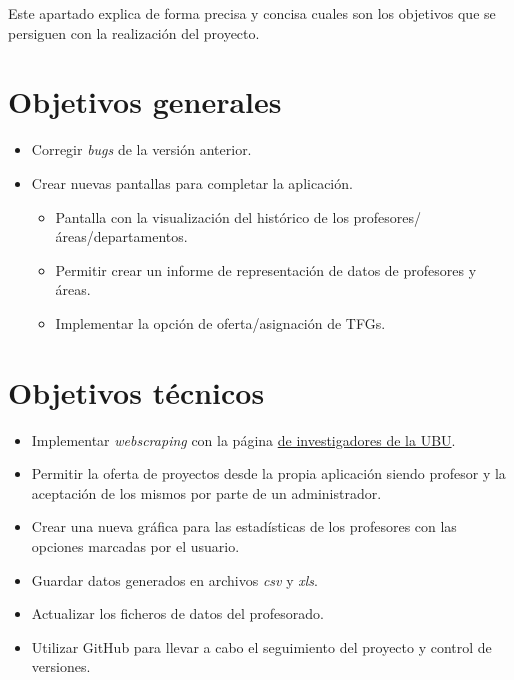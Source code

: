 
Este apartado explica de forma precisa y concisa cuales son los objetivos que se persiguen con la realización del proyecto.

\section{Objetivos generales}
\begin{itemize}
	\item Corregir \emph{bugs} de la versión anterior.
	\item Crear nuevas pantallas para completar la aplicación.
		\begin{itemize}
			\item Pantalla con la visualización del histórico de los profesores/áreas/departamentos.
			\item Permitir crear un informe de representación de datos de profesores y áreas.
			\item Implementar la opción de oferta/asignación de TFGs.
		\end{itemize}

	
\end{itemize}
\section{Objetivos técnicos}
\begin{itemize}
	\item Implementar \emph{webscraping} con la página \href{https://investigacion.ubu.es/unidades/2682/investigadores}{de investigadores de la UBU}.
	\item Permitir la oferta de proyectos desde la propia aplicación siendo profesor y la aceptación de los mismos por parte de un administrador.
	\item Crear una nueva gráfica para las estadísticas de los profesores con las opciones marcadas por el usuario.
	\item Guardar datos generados en archivos \emph{csv} y \emph{xls}.
	\item Actualizar los ficheros de datos del profesorado.
	\item Utilizar GitHub para llevar a cabo el seguimiento del proyecto y control de versiones.
\end{itemize}